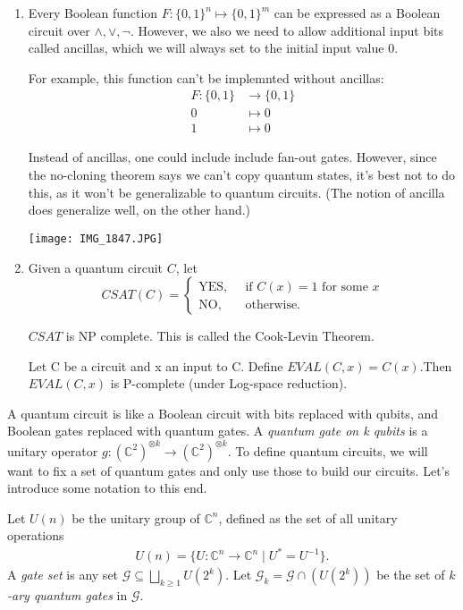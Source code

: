 \documentclass{article}
\begin{document}
\begin{enumerate}
 \item Every Boolean function $ F:\{0,1\}^{n} \mapsto \{0,1\}^{m}$ can be expressed as a Boolean circuit over $ \wedge, \vee, \neg$. However, we also we need to allow additional input bits called ancillas, which we will always set to the initial input value $0$.

For example, this function can't be implemnted without ancillas:
\begin{align*}
	F: \{0,1\} &\to \{0,1\}\\
	0 &\mapsto 0 \\ 1 &\mapsto 0 
\end{align*}

Instead of ancillas, one could include include fan-out gates.  However, since the no-cloning theorem says we can't copy quantum states, it's best not to do this, as it won't be generalizable to quantum circuits.  (The notion of ancilla does generalize well, on the other hand.) 

\begin{center}
\texttt{[image: IMG\_1847.JPG]}
\end{center}
 \item Given a quantum circuit $ C$, let
\[
CSAT(C) = \begin{cases}
\text{YES, } & \text{ if } C(x)=1 \text{ for some $x$} \\
\text{NO, } & \text{ otherwise.}
\end{cases}
\]

$CSAT$ is NP complete. This is called the Cook-Levin Theorem.

Let C be a circuit and x an input to C. Define $EVAL(C,x)=C(x)$.Then $EVAL(C,x)$ is P-complete (under Log-space reduction).
\end{enumerate}

A quantum circuit is like a Boolean circuit with bits replaced with qubits, and Boolean gates replaced with quantum gates.  A \emph{quantum gate on k qubits} is a unitary operator $ g: {({\mathds{C}}^{2})}^{\otimes k} \to {({\mathds{C}}^{2})}^{\otimes k}$.  To define quantum circuits, we will want to fix a set of quantum gates and only use those to build our circuits.  Let's introduce some notation to this end.

Let $ U(n)$ be the unitary group of $ \mathds{C}^n $, defined as the set of all unitary operations 
\begin{align*}
 U(n)= \{U:{\mathds{C}}^{n} \to {\mathds{C}}^{n} \mid U^{*}=U^{-1}\}.
\end{align*}
A \emph{gate set} is any set $ \mathscr{G} \subseteq \bigsqcup_{k \geq 1} U(2^{k})$.  Let $ \mathscr{G}_{k}=\mathscr{G} \cap (U(2^{k}))$ be the set of \emph{$k$-ary quantum gates} in $\mathscr{G}$.
\end{document}
